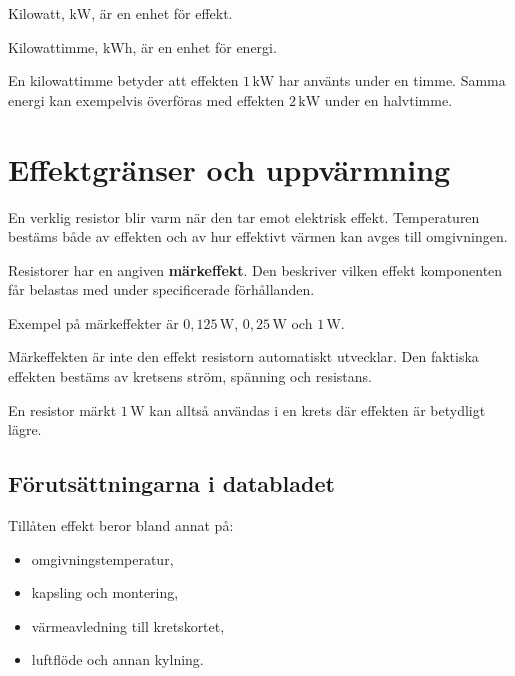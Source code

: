 \documentclass[
  swedish,
  11pt,
  a4paper,
  DIV=11,
  numbers=noendperiod,
  twoside,
  open=any]{scrreprt}
\providecommand{\tightlist}{%
  \setlength{\itemsep}{0pt}\setlength{\parskip}{0pt}}
\begin{document}
\begin{tcolorbox}[enhanced jigsaw, arc=.35mm, bottomrule=.15mm, bottomtitle=1mm, breakable, colback=white, colbacktitle=quarto-callout-important-color!10!white, colframe=quarto-callout-important-color-frame, coltitle=black, left=2mm, leftrule=.75mm, opacityback=0, opacitybacktitle=0.6, rightrule=.15mm, title=\textcolor{quarto-callout-important-color}{\faExclamation}\hspace{0.5em}{Kilowatt och kilowattimme är olika storheter}, titlerule=0mm, toprule=.15mm, toptitle=1mm]

Kilowatt, \(\mathrm{kW}\), är en enhet för effekt.

Kilowattimme, \(\mathrm{kWh}\), är en enhet för energi.

En kilowattimme betyder att effekten \(1\,\mathrm{kW}\) har använts
under en timme. Samma energi kan exempelvis överföras med effekten
\(2\,\mathrm{kW}\) under en halvtimme.

\end{tcolorbox}

\section{Effektgränser och
uppvärmning}\label{sec-effekt-effektgranser-och-uppvarmning}

En verklig resistor blir varm när den tar emot elektrisk effekt.
Temperaturen bestäms både av effekten och av hur effektivt värmen kan
avges till omgivningen.

Resistorer har en angiven \textbf{märkeffekt}. Den beskriver vilken
effekt komponenten får belastas med under specificerade förhållanden.

Exempel på märkeffekter är \(0{,}125\,\mathrm{W}\),
\(0{,}25\,\mathrm{W}\) och \(1\,\mathrm{W}\).

Märkeffekten är inte den effekt resistorn automatiskt utvecklar. Den
faktiska effekten bestäms av kretsens ström, spänning och resistans.

En resistor märkt \(1\,\mathrm{W}\) kan alltså användas i en krets där
effekten är betydligt lägre.

\subsection{Förutsättningarna i
databladet}\label{sec-effekt-forutsattningarna-i-databladet}

Tillåten effekt beror bland annat på:

\begin{itemize}
\tightlist
\item
  omgivningstemperatur,
\item
  kapsling och montering,
\item
  värmeavledning till kretskortet,
\item
  luftflöde och annan kylning.
\end{itemize}
\end{document}
